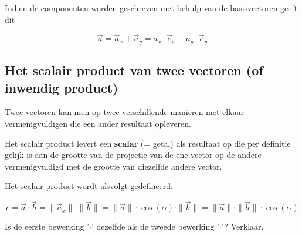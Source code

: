 \documentclass{ximera}
\begin{document}
Indien de componenten worden geschreven met behulp van de basisvectoren geeft dit 


$$
\vec{a} = \vec{a}_x + \vec{a}_y = a_x \cdot \vec{e}_x + a_y \cdot \vec{e}_y 
$$


\subsection*{Het scalair product van twee vectoren (of inwendig product)}

Twee vectoren kan men op twee verschillende manieren met elkaar vermenigvuldigen die een ander resultaat opleveren. 

Het scalair product levert een \textbf{scalar} (= getal) als resultaat op die per definitie gelijk is aan de grootte van de projectie van de ene vector op de andere vermenigvuldigd met de grootte van diezelfde andere vector. 

Het scalair product wordt alsvolgt gedefineerd: 

$$
c = \vec{a} \cdot \vec{b} = \| \vec{a}_x \| \cdot \|\vec{b}\| = \|\vec{a}\| \cdot \cos(\alpha) \cdot \|\vec{b}\| = \| \vec{a}\| \cdot \| \vec{b}\| \cdot \cos(\alpha)
$$

\begin{quickquestion*}{}{}
    Is de eerste bewerking '\(\cdot\)' dezelfde als de tweede bewerking '\(\cdot\)'? Verklaar. 
\end{quickquestion*}

\begin{image}[!]
\end{image}
\end{document}
